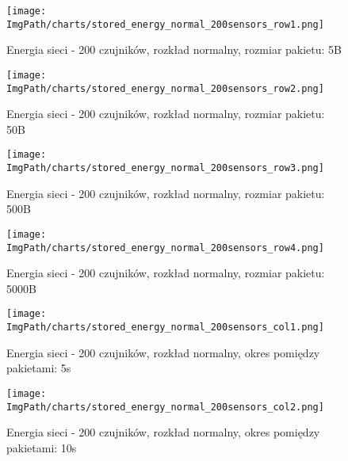 \begin{figure}[H]
	\begin{center}
		\texttt{[image: \\ImgPath/charts/stored\_energy\_normal\_200sensors\_row1.png]}
	\end{center}
	\caption{Energia sieci - 200 czujników, rozkład normalny, rozmiar pakietu: 5B}
\end{figure}

\begin{figure}[H]
	\begin{center}
		\texttt{[image: \\ImgPath/charts/stored\_energy\_normal\_200sensors\_row2.png]}
	\end{center}
	\caption{Energia sieci - 200 czujników, rozkład normalny, rozmiar pakietu: 50B}
\end{figure}

\begin{figure}[H]
	\begin{center}
		\texttt{[image: \\ImgPath/charts/stored\_energy\_normal\_200sensors\_row3.png]}
	\end{center}
	\caption{Energia sieci - 200 czujników, rozkład normalny, rozmiar pakietu: 500B}
\end{figure}

\begin{figure}[H]
	\begin{center}
		\texttt{[image: \\ImgPath/charts/stored\_energy\_normal\_200sensors\_row4.png]}
	\end{center}
	\caption{Energia sieci - 200 czujników, rozkład normalny, rozmiar pakietu: 5000B}
\end{figure}

\begin{figure}[H]
	\begin{center}
		\texttt{[image: \\ImgPath/charts/stored\_energy\_normal\_200sensors\_col1.png]}
	\end{center}
	\caption{Energia sieci - 200 czujników, rozkład normalny, okres pomiędzy pakietami: 5s}
\end{figure}

\begin{figure}[H]
	\begin{center}
		\texttt{[image: \\ImgPath/charts/stored\_energy\_normal\_200sensors\_col2.png]}
	\end{center}
	\caption{Energia sieci - 200 czujników, rozkład normalny, okres pomiędzy pakietami: 10s}
\end{figure}

